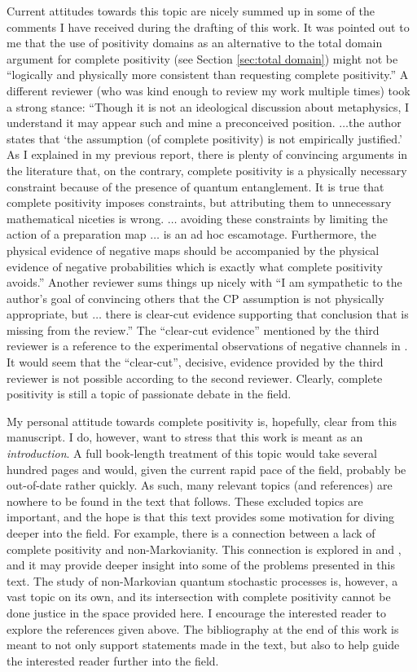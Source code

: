 Current attitudes towards this topic are nicely summed up in some of the comments I have received during the drafting of this work.  It was pointed out to me that the use of positivity domains as an alternative to the total domain argument for complete positivity (see Section \ref{sec:total domain}) might not be ``logically and physically more consistent than requesting complete positivity.''  A different reviewer (who was kind enough to review my work multiple times) took a strong stance: ``Though it is not an ideological discussion about metaphysics, I understand it may appear such and mine a preconceived position. $\ldots$the author states that `the assumption (of complete positivity) is not empirically justified.' As I explained in my previous report, there is plenty of convincing arguments in the literature that, on the contrary, complete positivity is a physically necessary constraint because of the presence of quantum entanglement. It is true that complete positivity imposes constraints, but attributing them to unnecessary mathematical niceties is wrong.  $\ldots$ avoiding these constraints by limiting the action of a preparation map $\ldots$ is an ad hoc escamotage.  Furthermore, the physical evidence of negative maps should be accompanied by the physical evidence of negative probabilities which is exactly what complete positivity avoids.''  Another reviewer sums things up nicely with ``I am sympathetic to the author's goal of convincing others that the CP assumption is not physically appropriate, but $\ldots$ there is clear-cut evidence supporting that conclusion that is missing from the review.''  The ``clear-cut evidence'' mentioned by the third reviewer is a reference to the experimental observations of negative channels in \cite{Boulant2004}.  It would seem that the ``clear-cut'', decisive, evidence provided by the third reviewer is not possible according to the second reviewer.  Clearly, complete positivity is still a topic of passionate debate in the field.

My personal attitude towards complete positivity is, hopefully, clear from this manuscript.  I do, however, want to stress that this work is meant as an {\em introduction}.  A full book-length treatment of this topic would take several hundred pages and would, given the current rapid pace of the field, probably be out-of-date rather quickly.  As such, many relevant topics (and references) are nowhere to be found in the text that follows.  These excluded topics are important, and the hope is that this text provides some motivation for diving deeper into the field.  For example, there is a connection between a lack of complete positivity and non-Markovianity.  This connection is explored in \cite{Rodríguez2012} and \cite{Mazzola2012}, and it may provide deeper insight into some of the problems presented in this text.  The study of non-Markovian quantum stochastic processes is, however, a vast topic on its own, and its intersection with complete positivity cannot be done justice in the space provided here.  I encourage the interested reader to explore the references given above.  The bibliography at the end of this work is meant to not only support statements made in the text, but also to help guide the interested reader further into the field.

